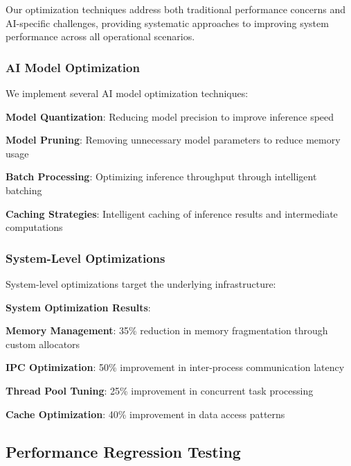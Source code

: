 Our optimization techniques address both traditional performance concerns and AI-specific challenges, providing systematic approaches to improving system performance across all operational scenarios.

\subsubsection*{AI Model Optimization}

We implement several AI model optimization techniques:

\begin{compactlist}
    \item \textbf{Model Quantization}: Reducing model precision to improve inference speed
    \item \textbf{Model Pruning}: Removing unnecessary model parameters to reduce memory usage
    \item \textbf{Batch Processing}: Optimizing inference throughput through intelligent batching
    \item \textbf{Caching Strategies}: Intelligent caching of inference results and intermediate computations
\end{compactlist}

\subsubsection*{System-Level Optimizations}

System-level optimizations target the underlying infrastructure:

\begin{successbox}
\textbf{System Optimization Results}:
\begin{compactlist}
    \item \textbf{Memory Management}: 35\% reduction in memory fragmentation through custom allocators
    \item \textbf{IPC Optimization}: 50\% improvement in inter-process communication latency
    \item \textbf{Thread Pool Tuning}: 25\% improvement in concurrent task processing
    \item \textbf{Cache Optimization}: 40\% improvement in data access patterns
\end{compactlist}
\end{successbox}

\subsection*{Performance Regression Testing}

